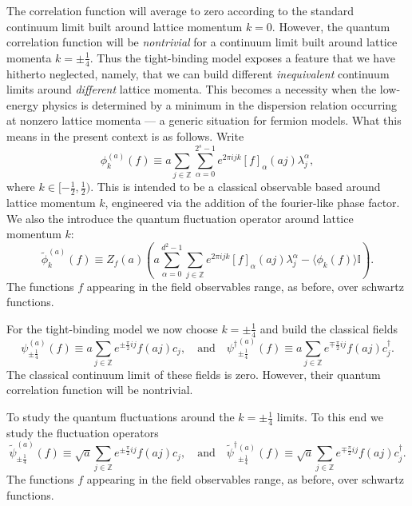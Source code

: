 \documentclass[prl,twocolumn,lengthcheck,superscriptaddress]{revtex4-1}
\theoremstyle{definition}
\theoremstyle{remark}
\begin{document}
The correlation function will average to zero according to the standard continuum limit built around lattice momentum $k=0$. However, the quantum correlation function will be \emph{nontrivial} for a continuum limit built around lattice momenta $k=\pm\frac14$. Thus the tight-binding model exposes a feature that we have hitherto neglected, namely, that we can build different \emph{inequivalent} continuum limits around \emph{different} lattice momenta. This becomes a necessity when the low-energy physics is determined by a minimum in the dispersion relation occurring at nonzero lattice momenta --- a generic situation for fermion models. What this means in the present context is as follows. Write
\begin{equation}
	\phi^{(a)}_k(f) \equiv a\sum_{j\in\mathbb{Z}} \sum_{\alpha=0}^{2^s-1} e^{2\pi i jk}[f]_\alpha(aj) \lambda_j^\alpha,
\end{equation}
where $k \in [-\frac12, \frac12)$. This is intended to be a classical observable based around lattice momentum $k$, engineered via the addition of the fourier-like phase factor. We also the introduce the quantum fluctuation operator around lattice momentum $k$:
\begin{equation}
	\widetilde{\phi}^{(a)}_k(f) \equiv Z_f(a)\left( a\sum_{\alpha=0}^{d^2-1}\sum_{j\in \mathbb{Z}} e^{2\pi i jk}[f]_\alpha(aj) \lambda^\alpha_j - \langle\phi_k(f)\rangle\mathbb{I}\right).
\end{equation}
The functions $f$ appearing in the field observables range, as before, over schwartz functions.

For the tight-binding model we now choose $k = \pm\frac14$ and build the classical fields 
\begin{equation}
	\psi^{(a)}_{\pm\frac{1}{4}}(f) \equiv a\sum_{j\in\mathbb{Z}} e^{\pm\frac{\pi}{2} i j}f(aj) c_j, \quad \text{and} \quad {\psi^\dag}^{(a)}_{\pm\frac{1}{4}}(f) \equiv a\sum_{j\in\mathbb{Z}} e^{\mp \frac{\pi}{2} i j}f(aj) c_j^\dag.
\end{equation}
The classical continuum limit of these fields is zero. However, their quantum correlation function will be nontrivial.

To study the quantum fluctuations around the $k=\pm \frac14$ limits. To this end we study the fluctuation operators
\begin{equation}
	\widetilde{\psi}^{(a)}_{\pm\frac14}(f) \equiv \sqrt{a}\sum_{j\in \mathbb{Z}} e^{\pm\frac{\pi}{2} i j}f(aj) c_j, \quad \text{and} \quad {\widetilde{\psi}^\dag}{}^{(a)}_{\pm\frac{1}{4}}(f) \equiv \sqrt{a}\sum_{j\in\mathbb{Z}} e^{\mp \frac{\pi}{2} i j}f(aj) c_j^\dag.
\end{equation}
The functions $f$ appearing in the field observables range, as before, over schwartz functions.
\end{document}
